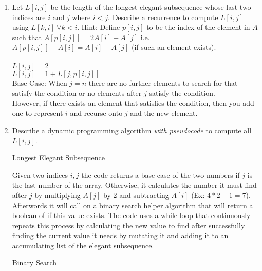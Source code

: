 \documentclass[11pt]{article}
\theoremstyle{definition}
\theoremstyle{theorem}
\begin{document}
\begin{enumerate}[label=(\alph*)]
	\item Let $L[i,j]$ be the length of the longest elegant subsequence whose last two indices are $i$ and $j$ where $i<j$. Describe a recurrence to compute $L[i,j]$ using $L[k,i]~\forall k<i$. Hint: Define $p[i,j]$ to be the index of the element in $A$ such that $A[p[i,j]] = 2A[i] - A[j]$ i.e. $A[p[i,j]] -A[i] = A[i] - A[j]$ (if such an element exists). \\\\
$L[i, j] = 2$ \\
$L[i, j] = 1 + L[j, p[i, j]]$ \\
Base Case: When $j = n$ there are no further elements to search for that satisfy the condition or no elements after $j$ satisfy the condition. \\
However, if there exists an element that satisfies the condition, then you add one to represent $i$ and recurse onto $j$ and the new element.
	
	\item Describe a dynamic programming algorithm {\em with pseudocode} to compute all $L[i,j]$. \\
\begin{algorithm}[H]
\caption{Longest Elegant Subsequence}
\end{algorithm}
Given two indices $i, j$ the code returns a base case of the two numbers if $j$ is the last number of the array. Otherwise, it calculates the number it must find after $j$ by multiplying $A[j]$ by 2 and subtracting $A[i]$ (Ex: $4*2 - 1 = 7$). Afterwords it will call on a binary search helper algorithm that will return a boolean of if this value exists. The code uses a while loop that continuously repeats this process by calculating the new value to find after successfully finding the current value it needs by mutating it and adding it to an accumulating list of the elegant subsequence. \\
\begin{algorithm}[H]
\caption{Binary Search}
\end{algorithm}
 

\end{enumerate}
\end{document}
